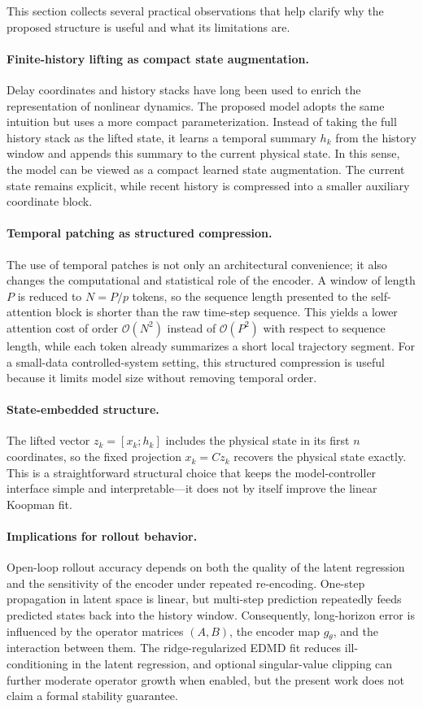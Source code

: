 \documentclass[journal]{IEEEtran}
\begin{document}
This section collects several practical observations that help clarify why the proposed structure is useful and what its limitations are.

\paragraph{Finite-history lifting as compact state augmentation.}
Delay coordinates and history stacks have long been used to enrich the representation of nonlinear dynamics. The proposed model adopts the same intuition but uses a more compact parameterization. Instead of taking the full history stack as the lifted state, it learns a temporal summary $h_k$ from the history window and appends this summary to the current physical state. In this sense, the model can be viewed as a compact learned state augmentation. The current state remains explicit, while recent history is compressed into a smaller auxiliary coordinate block.

\paragraph{Temporal patching as structured compression.}
The use of temporal patches is not only an architectural convenience; it also changes the computational and statistical role of the encoder. A window of length $P$ is reduced to $N=P/p$ tokens, so the sequence length presented to the self-attention block is shorter than the raw time-step sequence. This yields a lower attention cost of order $\mathcal{O}(N^2)$ instead of $\mathcal{O}(P^2)$ with respect to sequence length, while each token already summarizes a short local trajectory segment. For a small-data controlled-system setting, this structured compression is useful because it limits model size without removing temporal order.

\paragraph{State-embedded structure.}
The lifted vector $z_k=[x_k;h_k]$ includes the physical state in its first $n$ coordinates, so the fixed projection $x_k=Cz_k$ recovers the physical state exactly. This is a straightforward structural choice that keeps the model-controller interface simple and interpretable—it does not by itself improve the linear Koopman fit.

\paragraph{Implications for rollout behavior.}
Open-loop rollout accuracy depends on both the quality of the latent regression and the sensitivity of the encoder under repeated re-encoding. One-step propagation in latent space is linear, but multi-step prediction repeatedly feeds predicted states back into the history window. Consequently, long-horizon error is influenced by the operator matrices $(A,B)$, the encoder map $g_\theta$, and the interaction between them. The ridge-regularized EDMD fit reduces ill-conditioning in the latent regression, and optional singular-value clipping can further moderate operator growth when enabled, but the present work does not claim a formal stability guarantee.
\end{document}
